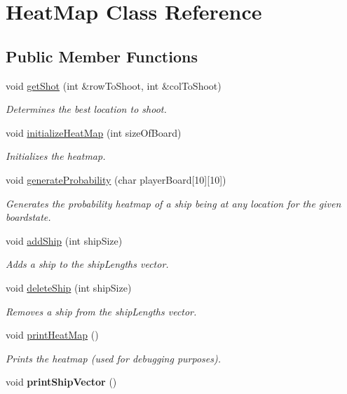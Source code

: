 \hypertarget{classHeatMap}{}\section{Heat\+Map Class Reference}
\label{classHeatMap}
\subsection*{Public Member Functions}
\begin{DoxyCompactItemize}
\item 
void \hyperlink{classHeatMap_a4d05dd4d96d186b99576a3139c70c102}{get\+Shot} (int \&row\+To\+Shoot, int \&col\+To\+Shoot)
\begin{DoxyCompactList}\small\item\em Determines the best location to shoot. \end{DoxyCompactList}\item 
void \hyperlink{classHeatMap_a3b10a4d728c77e5399820f94779bdadd}{initialize\+Heat\+Map} (int size\+Of\+Board)
\begin{DoxyCompactList}\small\item\em Initializes the heatmap. \end{DoxyCompactList}\item 
void \hyperlink{classHeatMap_a8a2f4ca868a52cc02515db6607ae844c}{generate\+Probability} (char player\+Board\mbox{[}10\mbox{]}\mbox{[}10\mbox{]})
\begin{DoxyCompactList}\small\item\em Generates the probability heatmap of a ship being at any location for the given boardstate. \end{DoxyCompactList}\item 
void \hyperlink{classHeatMap_aafeab5a6d0c316502deef11f2d82fbc4}{add\+Ship} (int ship\+Size)
\begin{DoxyCompactList}\small\item\em Adds a ship to the ship\+Lengths vector. \end{DoxyCompactList}\item 
void \hyperlink{classHeatMap_ab5447d4df83bee402e68abb67d136d76}{delete\+Ship} (int ship\+Size)
\begin{DoxyCompactList}\small\item\em Removes a ship from the ship\+Lengths vector. \end{DoxyCompactList}\item 
void \hyperlink{classHeatMap_acf289d30dc8dc913caed601720d30afc}{print\+Heat\+Map} ()\hypertarget{classHeatMap_acf289d30dc8dc913caed601720d30afc}{}\label{classHeatMap_acf289d30dc8dc913caed601720d30afc}

\begin{DoxyCompactList}\small\item\em Prints the heatmap (used for debugging purposes). \end{DoxyCompactList}\item 
void {\bfseries print\+Ship\+Vector} ()\hypertarget{classHeatMap_a16acb67000e14767f58e8612de86569f}{}\label{classHeatMap_a16acb67000e14767f58e8612de86569f}

\end{DoxyCompactItemize}


